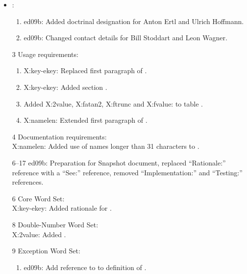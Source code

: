 
	\begin{itemize}
	\item {}:
		\begin{enumerate}
		\item \textsf{ed09b}: Added doctrinal designation for Anton Ertl and
			Ulrich Hoffmann.
		\item \textsf{ed09b}: Changed contact details for Bill Stoddart and
			Leon Wagner.
		\end{enumerate}

	\item[3] Usage requirements:
		\begin{enumerate}
		\item \textsf{X:key-ekey}: Replaced first paragraph of
			.
		\item \textsf{X:key-ekey}: Added section
			.
		\item Added \textsf{X:2value}, \textsf{X:fatan2}, \textsf{X:ftrunc}
			and \textsf{X:fvalue:} to table .
		\item \textsf{X:namelen}: Extended first paragraph of
			.
		\end{enumerate}

	\item[4] Documentation requirements: \\
		\textsf{X:namelen}: Added use of names longer than 31
			characters to .

	\item[6--17] \textsf{ed09b}: Preparation for Snapshot document,
		replaced ``Rationale:'' reference with a ``See:'' reference,
		removed ``Implementation:'' and ``Testing:'' references.

	\item[6] Core Word Set: \\
		\textsf{X:key-ekey}: Added rationale for .

	\item[8] Double-Number Word Set: \\
		\textsf{X:2value}: Added .

	\item[9] Exception Word Set:
		\begin{enumerate}
		\item \textsf{ed09b}: Add reference to
			 to definition of
			.


\end{enumerate}
\end{itemize}

